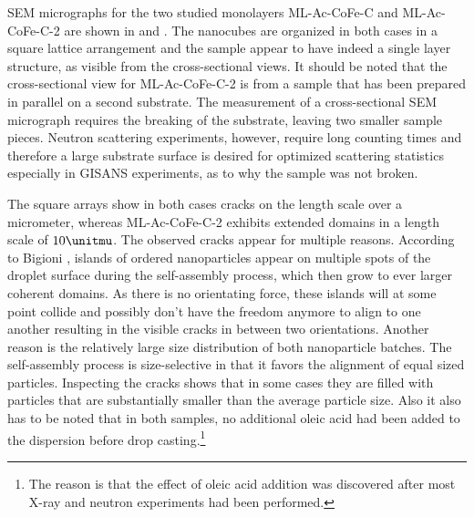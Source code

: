 \documentclass[\main/dresen_thesis.tex]{subfiles}
\begin{document}
  SEM micrographs for the two studied monolayers ML-Ac-CoFe-C and ML-Ac-CoFe-C-2 are shown in  and .
  The nanocubes are organized in both cases in a square lattice arrangement and the sample appear to have indeed a single layer structure, as visible from the cross-sectional views.
  It should be noted that the cross-sectional view for ML-Ac-CoFe-C-2 is from a sample that has been prepared in parallel on a second substrate.
  The measurement of a cross-sectional SEM micrograph requires the breaking of the substrate, leaving two smaller sample pieces.
  Neutron scattering experiments, however, require long counting times and therefore a large substrate surface is desired for optimized scattering statistics especially in GISANS experiments, as to why the sample was not broken.

  The square arrays show in both cases cracks on the length scale over a micrometer, whereas ML-Ac-CoFe-C-2 exhibits extended domains in a length scale of $10 \unitmu$.
  The observed cracks appear for multiple reasons.
  According to Bigioni \etal \cite{Bigioni_2006_Kinet}, islands of ordered nanoparticles appear on multiple spots of the droplet surface during the self-assembly process, which then grow to ever larger coherent domains.
  As there is no orientating force, these islands will at some point collide and possibly don't have the freedom anymore to align to one another resulting in the visible cracks in between two orientations.
  Another reason is the relatively large size distribution of both nanoparticle batches.
  The self-assembly process is size-selective in that it favors the alignment of equal sized particles.
  Inspecting the cracks shows that in some cases they are filled with particles that are substantially smaller than the average particle size.
  Also it also has to be noted that in both samples, no additional oleic acid had been added to the dispersion before drop casting.\footnote{The reason is that the effect of oleic acid addition was discovered after most X-ray and neutron experiments had been performed.}
\end{document}
